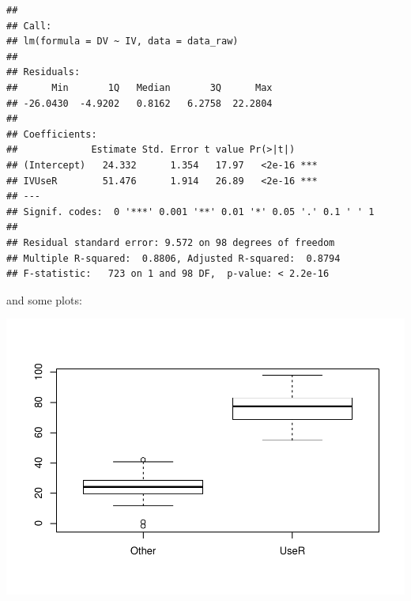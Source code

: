\documentclass[]{elsarticle} %
\makeatletter
\newenvironment{Shaded}{\begin{snugshade}}{\end{snugshade}}
\newcommand{\KeywordTok}[1]{\textcolor[rgb]{0.13,0.29,0.53}{\textbf{#1}}}
\newcommand{\NormalTok}[1]{#1}
\newcommand{\OperatorTok}[1]{\textcolor[rgb]{0.81,0.36,0.00}{\textbf{#1}}}
\def\maxwidth{\ifdim\Gin@nat@width>\linewidth\linewidth
\else\Gin@nat@width\fi}
\let\Oldincludegraphics\includegraphics
\renewcommand{\includegraphics}[1]{\Oldincludegraphics[width=\maxwidth]{#1}}
\makeatother
\begin{document}
\begin{verbatim}
## 
## Call:
## lm(formula = DV ~ IV, data = data_raw)
## 
## Residuals:
##      Min       1Q   Median       3Q      Max 
## -26.0430  -4.9202   0.8162   6.2758  22.2804 
## 
## Coefficients:
##             Estimate Std. Error t value Pr(>|t|)    
## (Intercept)   24.332      1.354   17.97   <2e-16 ***
## IVUseR        51.476      1.914   26.89   <2e-16 ***
## ---
## Signif. codes:  0 '***' 0.001 '**' 0.01 '*' 0.05 '.' 0.1 ' ' 1
## 
## Residual standard error: 9.572 on 98 degrees of freedom
## Multiple R-squared:  0.8806, Adjusted R-squared:  0.8794 
## F-statistic:   723 on 1 and 98 DF,  p-value: < 2.2e-16
\end{verbatim}

and some plots:

\begin{Shaded}
\end{Shaded}

\includegraphics{test_RSC_rmarkdown_to_paper_files/figure-latex/unnamed-chunk-3-1.pdf}
\end{document}
